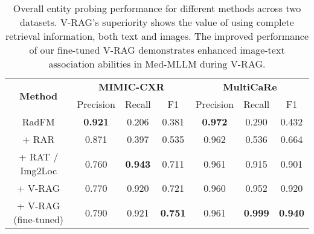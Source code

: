 \begin{table*}[]
\begin{center}

\begin{tabular}{ccccccc}
\hline
\multicolumn{1}{c}{\multirow{2}{*}{\textbf{Method}}} & \multicolumn{3}{c}{\textbf{MIMIC-CXR}}  & \multicolumn{3}{c}{\textbf{MultiCaRe}} \\
\cline{2-7} 
\multicolumn{1}{c}{} & Precision & Recall & F1 & Precision &   Recall & F1 \\ \hline
				
RadFM &  \textbf{0.921}	& 0.206 &	0.381    & \textbf{0.972}       &   0.290    &  0.432   \\ \hline

+ RAR &   0.871	& 0.397 &	0.535   & 0.962 & 0.536 & 0.664 \\ 

				
		
+ RAT / Img2Loc&  0.760 &	\textbf{0.943} &	0.711  & 0.961 &	0.915	& 0.901   \\ \hline

 + V-RAG  &   0.770	& {0.920}	& 0.721 &      0.960 &	{0.952} &	{0.920} \\

		
+ V-RAG (fine-tuned)  &    0.790	& 0.921	& \textbf{0.751} &      0.961 &\textbf{0.999} &	\textbf{0.940} \\ \hline

\end{tabular}
\caption{Overall entity probing performance for different methods across two datasets. V-RAG's superiority shows the value of using complete retrieval information, both text and images. The improved performance of our fine-tuned V-RAG demonstrates enhanced image-text association abilities in Med-MLLM during V-RAG.}
\vspace{-5mm}
\label{tb:overall}
\end{center}
\end{table*}
